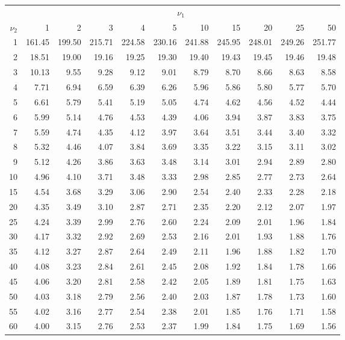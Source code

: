 \documentclass{article}
\begin{document}
	\begin{tabular}{|r|rrrrrrrrrr|}
		\hline
		& \multicolumn{10}{|c|}{$\nu_1$} \\ 
		$\nu_2$ & 1 & 2 & 3 & 4 & 5 & 10 & 15 & 20 & 25 & 50 \\ \hline
		1 & 161.45 & 199.50 & 215.71 & 224.58 & 230.16 & 241.88 & 245.95 & 248.01 & 
		249.26 & 251.77 \\ 
		2 & 18.51 & 19.00 & 19.16 & 19.25 & 19.30 & 19.40 & 19.43 & 19.45 & 19.46 & 
		19.48 \\ 
		3 & 10.13 & 9.55 & 9.28 & 9.12 & 9.01 & 8.79 & 8.70 & 8.66 & 8.63 & 8.58 \\ 
		4 & 7.71 & 6.94 & 6.59 & 6.39 & 6.26 & 5.96 & 5.86 & 5.80 & 5.77 & 5.70 \\ 
		5 & 6.61 & 5.79 & 5.41 & 5.19 & 5.05 & 4.74 & 4.62 & 4.56 & 4.52 & 4.44 \\ 
		6 & 5.99 & 5.14 & 4.76 & 4.53 & 4.39 & 4.06 & 3.94 & 3.87 & 3.83 & 3.75 \\ 
		7 & 5.59 & 4.74 & 4.35 & 4.12 & 3.97 & 3.64 & 3.51 & 3.44 & 3.40 & 3.32 \\ 
		8 & 5.32 & 4.46 & 4.07 & 3.84 & 3.69 & 3.35 & 3.22 & 3.15 & 3.11 & 3.02 \\ 
		9 & 5.12 & 4.26 & 3.86 & 3.63 & 3.48 & 3.14 & 3.01 & 2.94 & 2.89 & 2.80 \\ 
		10 & 4.96 & 4.10 & 3.71 & 3.48 & 3.33 & 2.98 & 2.85 & 2.77 & 2.73 & 2.64 \\ 
		15 & 4.54 & 3.68 & 3.29 & 3.06 & 2.90 & 2.54 & 2.40 & 2.33 & 2.28 & 2.18 \\ 
		20 & 4.35 & 3.49 & 3.10 & 2.87 & 2.71 & 2.35 & 2.20 & 2.12 & 2.07 & 1.97 \\ 
		25 & 4.24 & 3.39 & 2.99 & 2.76 & 2.60 & 2.24 & 2.09 & 2.01 & 1.96 & 1.84 \\ 
		30 & 4.17 & 3.32 & 2.92 & 2.69 & 2.53 & 2.16 & 2.01 & 1.93 & 1.88 & 1.76 \\ 
		35 & 4.12 & 3.27 & 2.87 & 2.64 & 2.49 & 2.11 & 1.96 & 1.88 & 1.82 & 1.70 \\ 
		40 & 4.08 & 3.23 & 2.84 & 2.61 & 2.45 & 2.08 & 1.92 & 1.84 & 1.78 & 1.66 \\ 
		45 & 4.06 & 3.20 & 2.81 & 2.58 & 2.42 & 2.05 & 1.89 & 1.81 & 1.75 & 1.63 \\ 
		50 & 4.03 & 3.18 & 2.79 & 2.56 & 2.40 & 2.03 & 1.87 & 1.78 & 1.73 & 1.60 \\ 
		55 & 4.02 & 3.16 & 2.77 & 2.54 & 2.38 & 2.01 & 1.85 & 1.76 & 1.71 & 1.58 \\ 
		60 & 4.00 & 3.15 & 2.76 & 2.53 & 2.37 & 1.99 & 1.84 & 1.75 & 1.69 & 1.56 \\ 

\end{tabular}
\end{document}
